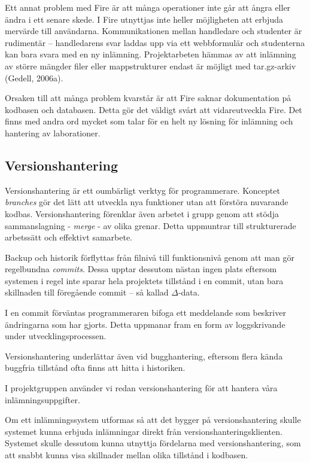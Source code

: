 Ett annat problem med Fire är att många operationer inte går att ångra eller ändra i ett senare skede. 
I Fire utnyttjas inte heller möjligheten att erbjuda mervärde till användarna. Kommunikationen mellan handledare och studenter är rudimentär – handledarens svar laddas upp via ett webbformulär och studenterna kan bara svara med en ny inlämning. Projektarbeten hämmas av att inlämning av större mängder filer eller mappstrukturer endast är möjligt med tar.gz-arkiv (Gedell, 2006a).

Orsaken till att många problem kvarstår är att Fire saknar dokumentation på kodbasen och databasen. Detta gör det väldigt svårt att vidareutveckla Fire.
Det finns med andra ord mycket som talar för en helt ny lösning för inlämning och hantering av laborationer.

\subsection{Versionshantering}

Versionshantering är ett oumbärligt verktyg för programmerare. Konceptet \emph{branches} gör det lätt att utveckla nya funktioner utan att förstöra nuvarande kodbas. Versionshantering förenklar även arbetet i grupp genom att stödja sammanslagning - \emph{merge} - av olika grenar. Detta uppmuntrar till strukturerade arbetssätt och effektivt samarbete. 

Backup och historik förflyttas från filnivå till funktionsnivå genom att man gör regelbundna \emph{commits}. Dessa upptar dessutom nästan ingen plats eftersom systemen i regel inte sparar hela projektets tillstånd i en commit, utan bara skillnaden till föregående commit – så kallad $\Delta$-data.

I en commit förväntas programmeraren bifoga ett meddelande som beskriver ändringarna som har gjorts. Detta uppmanar fram en form av loggskrivande under utvecklingsprocessen.

Versionshantering underlättar även vid bugghantering, eftersom flera kända buggfria tillstånd ofta finns att hitta i historiken.

I projektgruppen använder vi redan versionshantering för att hantera våra inlämningsuppgifter.

Om ett inlämningssystem utformas så att det bygger på versionshantering skulle systemet kunna erbjuda inlämningar direkt från versionshanteringsklienten. Systemet skulle dessutom kunna utnyttja fördelarna med versionshantering, som att snabbt kunna visa skillnader mellan olika tillstånd i kodbasen.

